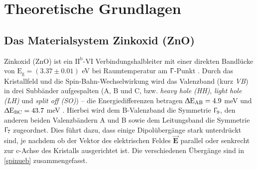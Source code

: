 \chapter{Theoretische Grundlagen}
\section{Das Materialsystem Zinkoxid (ZnO)}
\label{ZnOMat}
Zinkoxid (ZnO) ist ein $\text{II}^\text{b}$-VI Verbindungshalbleiter mit einer direkten Bandlücke von  $\text{E}_\text{g}= (\text{3.37} \pm \text{0.01})$ eV bei Raumtemperatur am $\Upgamma$-Punkt \cite{Klingshirn.2010}. Durch das \mbox{Kristallfeld} und die Spin-Bahn-Wechselwirkung wird das Valenzband (kurz \textit{VB}) in drei \mbox{Subbänder} aufgespalten (A, B und C, bzw. \textit{heavy hole (HH)}, \textit{light hole (LH)} und \textit{split off (SO)}) – die Energiedifferenzen betragen $\Updelta \text{E}_\text{AB}= \text{4.9}$ meV und $\Updelta \text{E}_\text{BC}= \text{43.7}$ meV \cite{Klingshirn.2010}.
Hierbei wird dem B-Valenzband die Symmetrie $\Upgamma_\text{9}$, den anderen beiden \mbox{Valenzbändern} A und B sowie dem Leitungsband die Symmetrie $\Upgamma_\text{7}$ zugeordnet. Dies führt dazu, dass einige \mbox{Dipolübergänge} stark unterdrückt sind, je nachdem ob der Vektor des \mbox{elektrischen} \mbox{Feldes} $\vec{\textbf{E}}$ parallel oder senkrecht zur c-Achse des Kristalls ausgerichtet ist. Die \mbox{verschiedenen} Übergänge sind in \autoref{spinueb} zusammengefasst. \\
